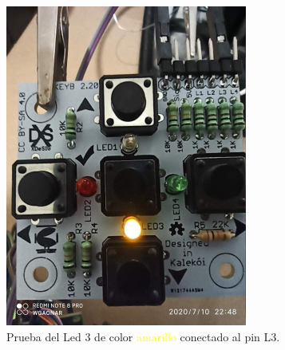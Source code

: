 \documentclass{article}
\begin{document}
\begin{figure}[H]
\begin{subfigure}[t]{0.3\textwidth}
        \includegraphics[width=0.9\columnwidth, height=1.2\columnwidth]{images/Botonera/botonera_ensambleLed_3.png}
        \caption{Prueba del Led 3 de color \textcolor{yellow}{amarillo} conectado al pin L3.}
        \label{fig:botonera_ensambleLed_3}
    \end{subfigure}%
    \begin{subfigure}[t]{0.3\textwidth}
        \centering

\end{subfigure}
\end{figure}
\end{document}
